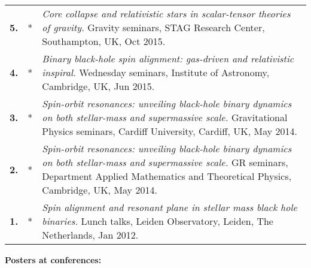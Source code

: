 \documentclass[11pt,letterpaper,sans]{moderncv}   %
\begin{document}
{\begin{longtable}{rp{0.4cm}p{15.8cm}}
%
\textbf{5.} & *& \textit{Core collapse and relativistic stars in scalar-tensor theories of gravity.}
\newline{} 
Gravity seminars, STAG Research Center, Southampton, UK, Oct 2015.
\vspace{0.05cm}\\
%
\textbf{4.} & *& \textit{Binary black-hole spin alignment: gas-driven and relativistic inspiral.}
\newline{} 
Wednesday seminars, Institute of Astronomy, Cambridge, UK, Jun 2015.\vspace{0.05cm}\\
%
\textbf{3.} & *& \textit{Spin-orbit resonances: unveiling black-hole binary dynamics on both stellar-mass and supermassive scale.}
\newline{} 
Gravitational Physics seminars, Cardiff University, Cardiff, UK, May 2014.
\vspace{0.05cm}\\
%
\textbf{2.} & *& \textit{Spin-orbit resonances: unveiling black-hole binary dynamics on both stellar-mass and supermassive scale.}
\newline{} 
GR seminars, Department Applied Mathematics and Theoretical Physics, Cambridge, UK, May 2014.
\vspace{0.05cm}\\
%
\textbf{1.} & *& \textit{Spin alignment and resonant plane in stellar mass black hole binaries.}
\newline{} 
Lunch talks, Leiden Observatory, Leiden, The Netherlands, Jan 2012.
\vspace{0.05cm}\\
%
\end{longtable}
}


\textcolor{color1}{\textbf{Posters at conferences:}}
\end{document}
